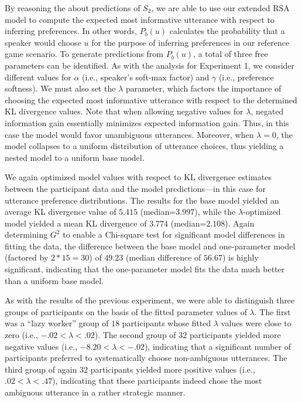 \documentclass[10pt,a4paper]{article}
\begin{document}
By reasoning the about predictions of $S_2$, we are able to use our extended RSA model to compute the expected most informative utterance with respect to inferring preferences. In other words, $P_b(u)$ calculates the probability that a speaker would choose $u$ for the purpose of inferring preferences in our reference game scenario.
To generate predictions from $P_b(u)$, a total of three free parameters can be identified. 
As with the analysis for Experiment 1, we consider different values for $\alpha$ (i.e., speaker's soft-max factor) and $\gamma$ (i.e., preference softness). 
We must also set the $\lambda$ parameter, which factors the importance of choosing the expected most informative utterance with respect to the determined KL divergence values.
Note that when allowing negative values for $\lambda$, negated information gain essentially minimizes expected information gain.
Thus, in this case the model would favor unambiguous utterances. 
Moreover, when $\lambda=0$, the model collapses to a uniform distribution of utterance choices, thus yielding a nested model to a uniform base model. 

We again optimized model values with respect to KL divergence estimates between the participant data and the model predictions---in this case for utterance preference distributions. 
The results for the base model yielded an average KL divergence value of $5.415$ (median=$3.997$), while the $\lambda$-optimized model yielded a mean KL divergence of $3.774$ (median=$2.108$).
Again determining $G^2$ to enable a Chi-square test for significant model differences in fitting the data, the difference between the base model and one-parameter model (factored by $2*15=30$) of $49.23$ (median difference of $56.67$) is highly significant, indicating that the one-parameter model fits the data much better than a uniform base model. 

As with the results of the previous experiment, we were able to distinguish three groups of participants on the basis of the fitted parameter values of $\lambda$. 
The first was a ``lazy worker'' group of $18$ participants whose fitted $\lambda$ values were close to zero (i.e.,  $-.02 < \lambda<.02$).
The second group of $32$ participants yielded more negative values (i.e., $-8.20<\lambda<-.02$), indicating that a significant number of participants preferred to systematically choose non-ambiguous utterances. 
The third group of again $32$ participants yielded more positive values (i.e., $.02<\lambda<.47$), indicating that these participants indeed chose the most ambiguous utterance in a rather strategic manner. 
\end{document}
